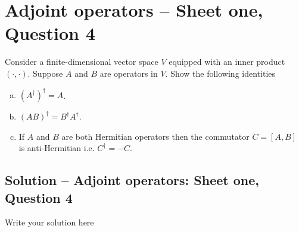 \section{Adjoint operators -- Sheet one, Question 4}
Consider a finite-dimensional vector space $V$ equipped with an inner product $(\cdot, \cdot)$. Suppose $A$ and $B$ are operators in $V$. Show the following identities
\begin{enumerate}[(a)]
\item $(A^{\dagger})^{\dagger} = A$. 
\item $(AB)^{\dagger} = B^{\dagger}A^{\dagger}$.
\item If $A$ and $B$ are both Hermitian operators then the commutator $C = [A, B]$ is anti-Hermitian i.e. $C^{\dagger} = -C$.
\end{enumerate}

\subsection{Solution -- Adjoint operators: Sheet one, Question 4}
Write your solution here